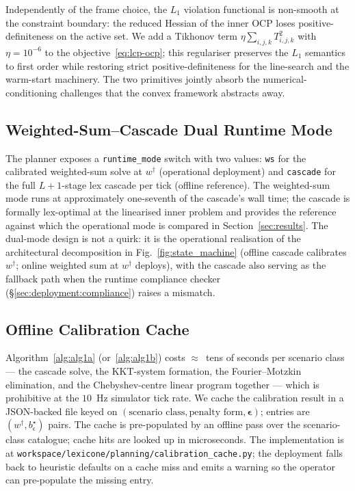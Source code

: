 Independently of the frame choice, the $L_1$ violation functional is non-smooth at the constraint boundary: the reduced Hessian of the inner OCP loses positive-definiteness on the active set. We add a Tikhonov term $\eta \sum_{i,j,k} T_{i,j,k}^{2}$ with $\eta = 10^{-6}$ to the objective~\eqref{eq:lcp-ocp}; this regulariser preserves the $L_1$ semantics to first order while restoring strict positive-definiteness for the line-search and the warm-start machinery. The two primitives jointly absorb the numerical-conditioning challenges that the convex framework abstracts away.

\subsection{Weighted-Sum--Cascade Dual Runtime Mode}
\label{sec:deployment:dual-mode}

The planner exposes a \texttt{runtime\_mode} switch with two values: \texttt{ws} for the calibrated weighted-sum solve at $w^{\dagger}$ (operational deployment) and \texttt{cascade} for the full $L+1$-stage lex cascade per tick (offline reference). The weighted-sum mode runs at approximately one-seventh of the cascade's wall time; the cascade is formally lex-optimal at the linearised inner problem and provides the reference against which the operational mode is compared in Section~\ref{sec:results}. The dual-mode design is not a quirk: it is the operational realisation of the architectural decomposition in Fig.~\ref{fig:state_machine} (offline cascade calibrates $w^{\dagger}$; online weighted sum at $w^{\dagger}$ deploys), with the cascade also serving as the fallback path when the runtime compliance checker (\S\ref{sec:deployment:compliance}) raises a mismatch.

\subsection{Offline Calibration Cache}
\label{sec:deployment:cache}

Algorithm~\ref{alg:alg1a} (or~\ref{alg:alg1b}) costs $\approx$~tens of seconds per scenario class --- the cascade solve, the KKT-system formation, the Fourier--Motzkin elimination, and the Chebyshev-centre linear program together --- which is prohibitive at the $10$~Hz simulator tick rate. We cache the calibration result in a JSON-backed file keyed on $(\text{scenario class}, \text{penalty form}, \boldsymbol{\epsilon})$; entries are $(w^{\dagger}, b_{\epsilon}^{\star})$ pairs. The cache is pre-populated by an offline pass over the scenario-class catalogue; cache hits are looked up in microseconds. The implementation is at \texttt{workspace/lexicone/planning/calibration\_cache.py}; the deployment falls back to heuristic defaults on a cache miss and emits a warning so the operator can pre-populate the missing entry.

